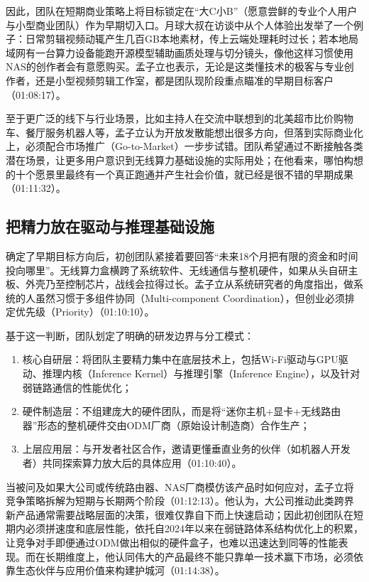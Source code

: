 \documentclass[UTF8,a4paper,11pt,fontset=fandol]{ctexart}
\begin{document}
因此，团队在短期商业策略上将目标锁定在“大C小B”（愿意尝鲜的专业个人用户与小型商业团队）作为早期切入口。月球大叔在访谈中从个人体验出发举了一个例子：日常剪辑视频动辄产生几百GB本地素材，传上云端处理耗时过长；若本地局域网有一台算力设备能跑开源模型辅助画质处理与切分镜头，像他这样习惯使用NAS的创作者会有意愿购买。孟子立也表示，无论是这类懂技术的极客与专业创作者，还是小型视频剪辑工作室，都是团队现阶段重点瞄准的早期目标客户（01:08:17）。

至于更广泛的线下与行业场景，比如主持人在交流中联想到的北美超市比价购物车、餐厅服务机器人等，孟子立认为开放发散能想出很多方向，但落到实际商业化上，必须配合市场推广（Go-to-Market）一步步试错。团队希望通过不断接触各类潜在场景，让更多用户意识到无线算力基础设施的实际用处；在他看来，哪怕构想的十个愿景里最终有一个真正跑通并产生社会价值，就已经是很不错的早期成果（01:11:32）。

\subsection{把精力放在驱动与推理基础设施}
确定了早期目标方向后，初创团队紧接着要回答“未来18个月把有限的资金和时间投向哪里”。无线算力盒横跨了系统软件、无线通信与整机硬件，如果从头自研主板、外壳乃至控制芯片，战线会拉得过长。孟子立从系统研究者的角度指出，做系统的人虽然习惯于多组件协同（Multi-component Coordination），但创业必须排定优先级（Priority）（01:10:10）。

基于这一判断，团队划定了明确的研发边界与分工模式：
\begin{enumerate}
\item 核心自研层：将团队主要精力集中在底层技术上，包括Wi-Fi驱动与GPU驱动、推理内核（Inference Kernel）与推理引擎（Inference Engine），以及针对弱链路通信的性能优化；
\item 硬件制造层：不组建庞大的硬件团队，而是将“迷你主机+显卡+无线路由器”形态的整机硬件交由ODM厂商（原始设计制造商）合作生产；
\item 上层应用层：与开发者社区合作，邀请更懂垂直业务的伙伴（如机器人开发者）共同探索算力放大后的具体应用（01:10:40）。
\end{enumerate}

当被问及如果大公司或传统路由器、NAS厂商模仿该产品时如何应对，孟子立将竞争策略拆解为短期与长期两个阶段（01:12:13）。他认为，大公司推动此类跨界新产品通常需要战略层面的决策，很难仅靠自下而上快速启动；因此初创团队在短期内必须拼速度和底层性能，依托自2024年以来在弱链路体系结构优化上的积累，让竞争对手即便通过ODM做出相似的硬件盒子，也难以迅速达到同等的性能表现。而在长期维度上，他认同伟大的产品最终不能只靠单一技术赢下市场，必须依靠生态伙伴与应用价值来构建护城河（01:14:38）。
\end{document}
